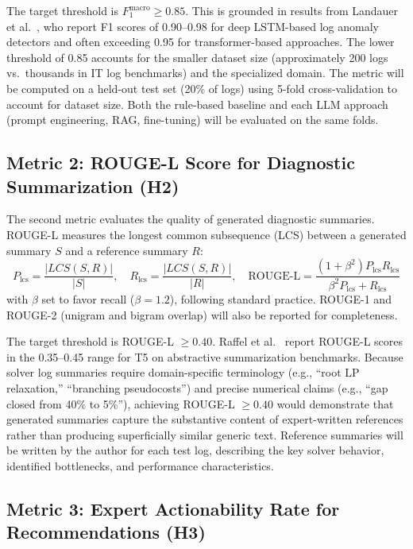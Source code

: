 \documentclass[11pt]{article}
\begin{document}
The target threshold is $F_1^{\text{macro}} \geq 0.85$. This is grounded in results from Landauer et al.\ \cite{landauer2023deeplearningloganomaly}, who report F1 scores of 0.90--0.98 for deep LSTM-based log anomaly detectors and often exceeding 0.95 for transformer-based approaches. The lower threshold of 0.85 accounts for the smaller dataset size (approximately 200 logs vs.\ thousands in IT log benchmarks) and the specialized domain. The metric will be computed on a held-out test set (20\% of logs) using 5-fold cross-validation to account for dataset size. Both the rule-based baseline and each LLM approach (prompt engineering, RAG, fine-tuning) will be evaluated on the same folds.

\subsection{Metric 2: ROUGE-L Score for Diagnostic Summarization (H2)}

The second metric evaluates the quality of generated diagnostic summaries. ROUGE-L measures the longest common subsequence (LCS) between a generated summary $S$ and a reference summary $R$:
\begin{equation}
    P_{\text{lcs}} = \frac{|LCS(S, R)|}{|S|}, \quad R_{\text{lcs}} = \frac{|LCS(S, R)|}{|R|}, \quad \text{ROUGE-L} = \frac{(1 + \beta^2) P_{\text{lcs}} R_{\text{lcs}}}{\beta^2 P_{\text{lcs}} + R_{\text{lcs}}}
\end{equation}
with $\beta$ set to favor recall ($\beta = 1.2$), following standard practice. ROUGE-1 and ROUGE-2 (unigram and bigram overlap) will also be reported for completeness.

The target threshold is ROUGE-L $\geq 0.40$. Raffel et al.\ \cite{raffel2020t5} report ROUGE-L scores in the 0.35--0.45 range for T5 on abstractive summarization benchmarks. Because solver log summaries require domain-specific terminology (e.g., ``root LP relaxation,'' ``branching pseudocosts'') and precise numerical claims (e.g., ``gap closed from 40\% to 5\%''), achieving ROUGE-L $\geq 0.40$ would demonstrate that generated summaries capture the substantive content of expert-written references rather than producing superficially similar generic text. Reference summaries will be written by the author for each test log, describing the key solver behavior, identified bottlenecks, and performance characteristics.

\subsection{Metric 3: Expert Actionability Rate for Recommendations (H3)}
\end{document}
